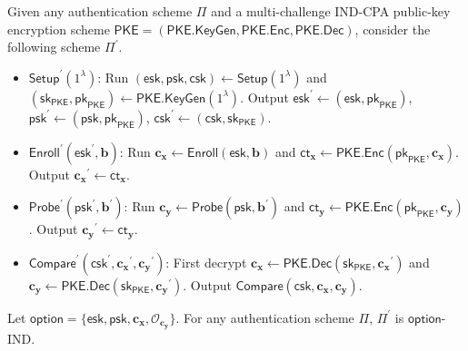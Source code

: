 Given any authentication scheme $\Pi$ and a multi-challenge IND-CPA public-key encryption scheme $\mathsf{PKE} = (\mathsf{PKE.KeyGen}, \allowbreak \mathsf{PKE.Enc}, \mathsf{PKE.Dec})$, consider the following scheme $\Pi^\prime$. 

\begin{itemize}

	\item $\mathsf{Setup}^\prime (1^\lambda)$: Run $(\mathsf{esk}, \mathsf{psk}, \mathsf{csk}) \gets \mathsf{Setup}(1^\lambda)$ and $(\mathsf{sk}_{\mathsf{PKE}}, \mathsf{pk}_{\mathsf{PKE}}) \gets \mathsf{PKE.KeyGen}(1^\lambda)$. Output $\mathsf{esk}^\prime \gets ( \mathsf{esk}, \mathsf{pk}_{\mathsf{PKE}} ) $, $\mathsf{psk}^\prime \gets (\mathsf{psk}, \mathsf{pk}_{\mathsf{PKE}})$, $\mathsf{csk}^\prime \gets (\mathsf{csk}, \mathsf{sk}_{\mathsf{PKE}} )$.

	\item $\mathsf{Enroll}^\prime (\mathsf{esk}^\prime, \mathbf{b})$: Run $\mathbf{c_x} \gets \mathsf{Enroll}(\mathsf{esk}, \mathbf{b})$ and $\mathsf{ct}_{\mathbf{x}} \gets \mathsf{PKE.Enc}(\mathsf{pk}_{\mathsf{PKE}}, \mathbf{c_x})$. Output $\mathbf{c_x}^\prime \gets \mathsf{ct}_{\mathbf{x}}$.

	\item $\mathsf{Probe}^\prime (\textsf{psk}^\prime, \mathbf{b}^\prime)$: Run $\mathbf{c_y} \gets \textsf{Probe}(\textsf{psk}, \mathbf{b}^\prime)$ and $\textsf{ct}_{\mathbf{y}} \gets \textsf{PKE.Enc}(\textsf{pk}_{\textsf{PKE}}, \mathbf{c_y})$. Output $\mathbf{c_y}^\prime \gets \textsf{ct}_{\mathbf{y}}$.

	\item $\textsf{Compare}^\prime (\textsf{csk}^\prime, \mathbf{c_x}^\prime, \mathbf{c_y}^\prime)$: First decrypt $\mathbf{c_x} \gets \textsf{PKE.Dec}(\textsf{sk}_{\textsf{PKE}}, \mathbf{c_x}^\prime)$ and  $\mathbf{c_y} \gets \textsf{PKE.Dec}(\textsf{sk}_{\textsf{PKE}}, \mathbf{c_y}^\prime)$. Output $\textsf{Compare}(\textsf{csk}, \mathbf{c_x}, \mathbf{c_y})$.
\end{itemize}

\begin{theorem}
\label{thm:mc-ind-cpa:ind-esk-psk}
	Let $\textsf{option} = \{ \textsf{esk}, \textsf{psk}, \mathbf{c_x}, \mathcal{O}_{\mathbf{c_y}} \}$. For any authentication scheme $\Pi$, $\Pi^\prime$ is $\textsf{option}$-IND. 
\end{theorem}

